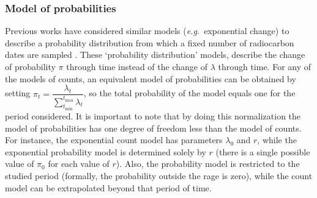 \documentclass[a4paper]{article}
\begin{document}



\subsubsection*{Model of probabilities}

Previous works have considered similar models (\emph{e.g.}\ exponential change) to describe a probability distribution from which a fixed number of radiocarbon dates are sampled \parencite{Porcic2020, Crema2021b, Timpson2020}. These `probability distribution' models, describe the change of probability $\pi$ through time instead of the change of $\lambda$ through time. For any of the models of counts, an equivalent model of probabilities can be obtained by setting $\pi_t=\dfrac{\lambda_t}{ \displaystyle\sum\limits_{t_{\min}}^{t_{\max}} \lambda_t }$, so the total probability of the model equals one for the period considered. It is important to note that by doing this normalization the model of probabilities has one degree of freedom less than the  model of counts. For instance, the exponential count model has parameters $\lambda_0$ and $r$, while the exponential probability model is determined solely by $r$ (there is a single possible value of $\pi_0$ for each value of $r$). Also, the probability model is restricted to the studied period (formally, the probability outside the rage is zero), while the count model can be extrapolated beyond that period of time.
\\





%
\end{document}
